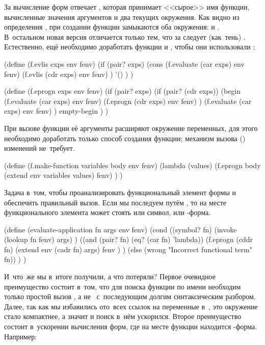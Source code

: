 За вычисление форм отвечает , которая принимает
<<сырое>> имя функции, вычисленные значения аргументов и два текущих окружения.
Как видно из определения , при создании функции замыкаются оба
окружения:  и . В~остальном новая версия отличается только тем,
что за  следует (как~тень) . Естественно, ещё необходимо
доработать функции  и , чтобы они использовали :

\begin{code:lisp}
(define (f.evlis exps env fenv)
  (if (pair? exps)
      (cons (f.evaluate (car exps) env fenv)
            (f.evlis (cdr exps) env fenv) )
      '() ) )

(define (f.eprogn exps env fenv)
  (if (pair? exps)
    (if (pair? (cdr exps))
        (begin (f.evaluate (car exps) env fenv)
               (f.eprogn (cdr exps) env fenv) )
        (f.evaluate (car exps) env fenv) )
    empty-begin ) )
\end{code:lisp}

При вызове функции её аргументы расширяют окружение переменных, для этого
необходимо доработать только способ создания функции; механизм вызова
() изменений не~требует.

\begin{code:lisp}
(define (f.make-function variables body env fenv)
  (lambda (values)
    (f.eprogn body (extend env variables values) fenv) ) )
\end{code:lisp}

Задача  в~том, чтобы проанализировать функциональный
элемент формы и обеспечить правильный вызов. Если мы последуем путём
{\CommonLisp}, то на месте функционального элемента может стоять или символ,
или -форма.

\begin{code:lisp}[label=lisp1-2-omega/lisp2/src:erroneous-eval-application]
(define (evaluate-application fn args env fenv)
  (cond ((symbol? fn)
         (invoke (lookup fn fenv) args) )
        ((and (pair? fn) (eq? (car fn) 'lambda))
         (f.eprogn (cddr fn)
                   (extend env (cadr fn) args)
                   fenv ) )
        (else (wrong "Incorrect functional term" fn)) ) )
\end{code:lisp}

И~что~же мы в~итоге получили, а что потеряли? Первое очевидное преимущество
состоит в~том, что для поиска функции по имени необходим только простой вызов
, а не~ с~последующим долгим синтаксическим разбором.
Далее, так как мы избавились ото~всех ссылок на переменные в~, это
окружение стало компактнее, а значит и поиск в~нём ускорился. Второе
преимущество состоит в~ускорении вычисления форм, где на месте функции находится
-форма. Например:

